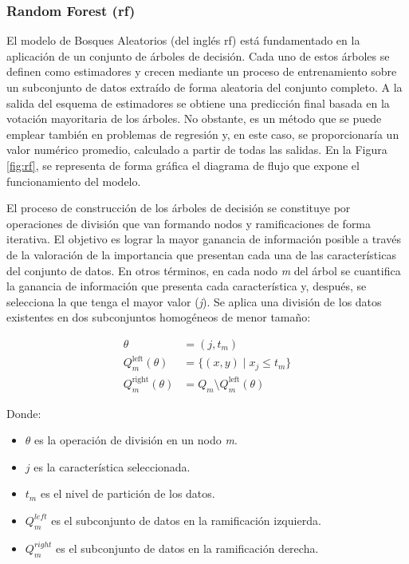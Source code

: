 \subsubsection{Random Forest (\acrshort{rf})}
\label{sec:mlrf}

El modelo de Bosques Aleatorios (del inglés \acrfull{rf}) está fundamentado en la aplicación de un conjunto de árboles de decisión. Cada uno de estos árboles se definen como estimadores y crecen mediante un proceso de entrenamiento sobre un subconjunto de datos extraído de forma aleatoria del conjunto completo. A la salida del esquema de estimadores se obtiene una predicción final basada en la votación mayoritaria de los árboles. No obstante, es un método que se puede emplear también en problemas de regresión y, en este caso, se proporcionaría un valor numérico promedio, calculado a partir de todas las salidas. En la Figura \ref{fig:rf}, se representa de forma gráfica el diagrama de flujo que expone el funcionamiento del modelo. \cite{rfmedium}

\vspace{3mm}

El proceso de construcción de los árboles de decisión se constituye por operaciones de división que van formando nodos y ramificaciones de forma iterativa. El objetivo es lograr la mayor ganancia de información posible a través de la valoración de la importancia que presentan cada una de las características del conjunto de datos. En otros términos, en cada nodo \textit{m} del árbol se cuantifica la ganancia de información que presenta cada característica y, después, se selecciona la que tenga el mayor valor (\textit{j}). Se aplica una división de los datos existentes en dos subconjuntos homogéneos de menor tamaño: \cite{rfmedium2}

\begin{equation}
    \begin{aligned}
        \theta &= (j, t_m) \\
        Q_m^{\text{left}}(\theta) &= \{(x, y) \mid x_j \leq t_m\} \\
        Q_m^{\text{right}}(\theta) &= Q_m \setminus Q_m^{\text{left}}(\theta)
    \end{aligned}
\end{equation}
    

Donde:
\begin{itemize}
    \renewcommand{\labelitemi}{}
    \item \( \theta \) es la operación de división en un nodo \textit{m}.
    \item \( j\) es la característica seleccionada.
    \item \( t_m\) es el nivel de partición de los datos.
    \item \( Q_m^{left}\) es el subconjunto de datos en la ramificación izquierda.
    \item \( Q_m^{right}\) es el subconjunto de datos en la ramificación derecha.
\end{itemize}

